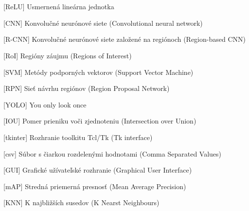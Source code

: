 \cleardoublepage
\chapter*{\listofabbrevname}
{}

\begin{acronym}[KolikMista]

		[ReLU]
		{Usmernená lineárna jednotka}

		[CNN]
		{Konvolučné neurónové siete (Convolutional neural network)}

		[R-CNN]
		{Konvolučné neurónové siete založené na regiónoch (Region-based CNN)}

		[RoI]
		{Regióny záujmu (Regions of Interest)}

		[SVM]
		{Metódy podporných vektorov (Support Vector Machine)}

		[RPN]
		{Sieť návrhu regiónov (Region Proposal Network)}

		[YOLO]
		{You only look once}
	
		[IOU]
		{Pomer prieniku voči zjednoteniu (Intersection over Union)}
	
		[tkinter]
		{Rozhranie toolkitu Tcl/Tk (Tk interface)}

		[csv]
		{Súbor s čiarkou rozdelenými hodnotami (Comma Separated Values)}

		[GUI]
		{Grafické užívateľské rozhranie (Graphical User Interface)}

		[mAP]
		{Stredná priemerná presnosť (Mean Average Precision)}

		[KNN]
		{K najbližších susedov (K Nearst Neighbours)}




\end{acronym}
